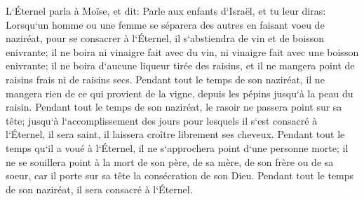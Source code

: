 \verse L`Éternel parla à Moïse, et dit: 
\verse Parle aux enfants d`Israël, et tu leur diras: Lorsqu`un homme ou une femme se séparera des autres en faisant voeu de naziréat, pour se consacrer à l`Éternel, 
\verse il s`abstiendra de vin et de boisson enivrante; il ne boira ni vinaigre fait avec du vin, ni vinaigre fait avec une boisson enivrante; il ne boira d`aucune liqueur tirée des raisins, et il ne mangera point de raisins frais ni de raisins secs. 
\verse Pendant tout le temps de son naziréat, il ne mangera rien de ce qui provient de la vigne, depuis les pépins jusqu`à la peau du raisin. 
\verse Pendant tout le temps de son naziréat, le rasoir ne passera point sur sa tête; jusqu`à l`accomplissement des jours pour lesquels il s`est consacré à l`Éternel, il sera saint, il laissera croître librement ses cheveux. 
\verse Pendant tout le temps qu`il a voué à l`Éternel, il ne s`approchera point d`une personne morte; 
\verse il ne se souillera point à la mort de son père, de sa mère, de son frère ou de sa soeur, car il porte sur sa tête la consécration de son Dieu. 
\verse Pendant tout le temps de son naziréat, il sera consacré à l`Éternel. 
